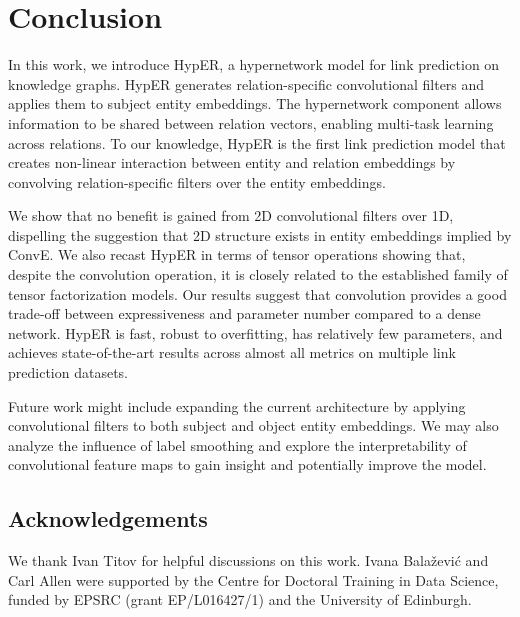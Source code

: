 \documentclass[runningheads]{llncs}
\begin{document}
\section{Conclusion}
In this work, we introduce HypER, a hypernetwork model for link prediction on knowledge graphs. HypER generates relation-specific convolutional filters and applies them to subject entity embeddings. The hypernetwork component allows information to be shared between relation vectors, enabling multi-task learning across relations. To our knowledge, HypER is the first link prediction model that creates  non-linear interaction between entity and relation embeddings by convolving relation-specific filters over the entity embeddings. 

We  show that no benefit is gained from 2D convolutional filters over 1D, dispelling the suggestion that 2D structure exists in entity embeddings implied by ConvE. We also recast HypER in terms of tensor operations showing that, despite the convolution operation, it is closely related to the established family of tensor factorization models. Our results suggest that convolution provides a good trade-off between expressiveness and parameter number compared to a dense network. HypER is fast, robust to overfitting, has relatively few parameters, and achieves state-of-the-art results across almost all metrics on multiple link prediction datasets.

Future work might include expanding the current architecture by applying convolutional filters to both subject and object entity embeddings. We may also analyze the influence of label smoothing and explore the interpretability of convolutional feature maps to gain insight and potentially improve the model.

\subsection*{Acknowledgements}
We thank Ivan Titov for helpful discussions on this work. Ivana Bala\v{z}evi\'c and Carl Allen were supported by the Centre for Doctoral Training in Data Science, funded by EPSRC (grant EP/L016427/1) and the University of Edinburgh.



\end{document}
